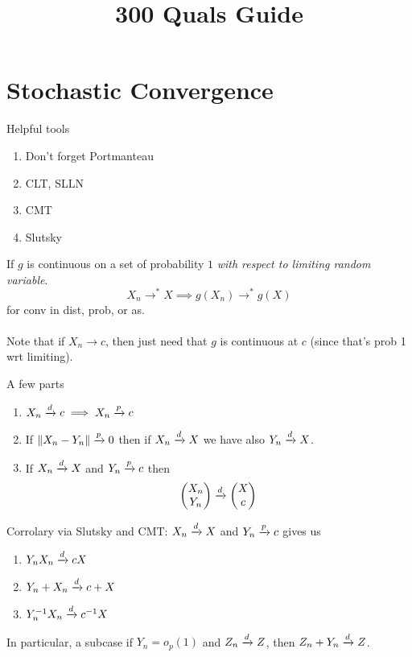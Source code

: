 \documentclass{article}
\title{300 Quals Guide}
\begin{document}
\maketitle
\section{Stochastic Convergence}
Helpful tools
\begin{enumerate}
	\item Don't forget Portmanteau
	\item CLT, SLLN 
	\item CMT
	\item Slutsky
\end{enumerate} 
\begin{theorem}[CMT]
If $g$ is continuous on a set of probability $1$ \textit{with respect to limiting random variable}.
$$X_n\to^* X \implies g(X_n) \to^* g(X)$$
for conv in dist, prob, or as.\\\\
Note that if $X_n\to c$, then just need that $g$ is continuous at $c$ (since that's prob 1 wrt limiting).
\end{theorem}
\begin{theorem}[Slutsky]
A few parts
\begin{enumerate}
	\item $X_n \xrightarrow{d} c \implies X_n \xrightarrow{p} c$
	\item If $\|X_n - Y_n\| \xrightarrow{p} 0$ then if $X_n \xrightarrow{d} X$ we have also $Y_n \xrightarrow{d} X$. 
	\item If $X_n \xrightarrow{d} X$ and $Y_n \xrightarrow{p} c$ then
	$$\begin{pmatrix}
		X_n\\Y_n 
	\end{pmatrix}\xrightarrow{d} \begin{pmatrix}
		X\\c 
	\end{pmatrix}$$
	\end{enumerate}
	Corrolary via Slutsky and CMT:
	$X_n\xrightarrow{d} X$ and $Y_n \xrightarrow{p} c$ gives us 
	\begin{enumerate}
	\item $Y_n X_n \xrightarrow{d} cX$
	\item $Y_n + X_n \xrightarrow{d} c+ X$
	\item $Y_n^{-1} X_n \xrightarrow{d} c^{-1} X$
	\end{enumerate}

\end{theorem}
In particular, a subcase if $Y_n = o_p(1)$ and $Z_n \xrightarrow{d} Z$, then $Z_n + Y_n \xrightarrow{d} Z$.  
\end{document}
